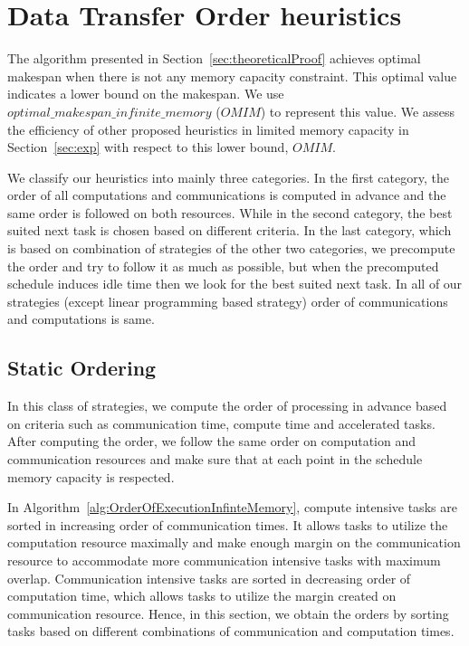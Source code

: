 \documentclass[sigconf]{acmart}
\begin{document}
	
	
	\section{Data Transfer Order heuristics}
	\label{sec:heuristics}
	
	The algorithm presented in Section~\ref{sec:theoreticalProof} achieves optimal makespan when there is not any memory capacity constraint. This optimal value indicates a lower bound on the makespan. We use $optimal\_ \allowbreak makespan\_  \allowbreak infinite\_  \allowbreak memory$ ($OMIM$) to represent this value. We assess the efficiency of other proposed heuristics in limited memory capacity in Section~\ref{sec:exp} with respect to this lower bound, $OMIM$.
	
	
	We classify our heuristics into mainly three categories. In the first category, the order of all computations and communications is computed in advance and the same order is followed on both resources. While in the second category, the best suited next task is chosen based on different criteria. In the last category, which is based on combination of strategies of the other two categories, we precompute the order and try to follow it as much as possible, but when the precomputed schedule induces idle time then we look for the best suited next task. In all of our strategies (except linear programming based strategy) order of communications and computations is same.
	
	\subsection{Static Ordering}
	In this class of strategies, we compute the order of processing in advance based on criteria such as communication time, compute time and accelerated tasks. After computing the order, we follow the same order on computation and communication resources and make sure that at each point in the schedule memory capacity is respected.
	
	
	In Algorithm~\ref{alg:OrderOfExecutionInfinteMemory}, compute intensive tasks are sorted in increasing order of communication times. It allows tasks to utilize the computation resource maximally and make enough margin on the communication resource to accommodate more communication intensive tasks with maximum overlap. Communication intensive tasks are sorted in decreasing order of computation time, which allows tasks to utilize the margin created on communication resource. Hence, in this section, we obtain the orders by sorting tasks based on different combinations of communication and computation times.
	
\end{document}
